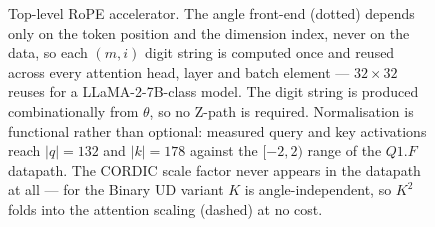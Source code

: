 \begin{figure}[t]
\caption{Top-level RoPE accelerator. The angle front-end (dotted) depends only
on the token position and the dimension index, never on the data, so each
$(m,i)$ digit string is computed once and reused across every attention head,
layer and batch element --- $32\times32$ reuses for a LLaMA-2-7B-class model. The digit string is produced
combinationally from $\theta$, so no Z-path is required. Normalisation is
functional rather than optional: measured query and key activations reach
$|q|=132$ and $|k|=178$ against the $[-2,2)$ range of the $Q1.F$ datapath.
The CORDIC scale factor never appears in the datapath at all --- for the
Binary UD variant $K$ is angle-independent, so $K^2$ folds into the attention
scaling (dashed) at no cost.}
\label{fig:arch}
\end{figure}
